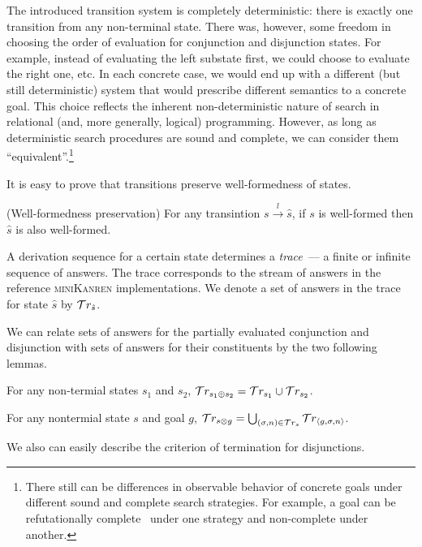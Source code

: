 The introduced transition system is completely deterministic: there is exactly one transition from any non-terminal state.
There was, however, some freedom in choosing the order of evaluation for conjunction and
disjunction states. For example, instead of evaluating the left substate first, we could choose to evaluate the right one, etc. In each concrete case, we would
end up with a different (but still deterministic) system that would prescribe different semantics to a concrete goal. This choice reflects the inherent
non-deterministic nature of search in relational (and, more generally, logical) programming. However, as long as deterministic search procedures
are sound and complete, we can consider them ``equivalent''.\footnote{There still can be differences in observable behavior of concrete goals under different
sound and complete search strategies. For example, a goal can be refutationally complete~\cite{WillThesis} under one strategy and non-complete under another.}

It is easy to prove that transitions preserve well-formedness of states.

\begin{lemma}{(Well-formedness preservation)}
\label{lem:well_formedness_preservation}
For any transintion $s \xrightarrow{l} \hat{s}$, if $s$ is well-formed then $\hat{s}$ is also well-formed.
\end{lemma}

A derivation sequence for a certain state determines a \emph{trace}~--- a finite or infinite sequence of answers. The trace corresponds to the stream of answers
in the reference \textsc{miniKanren} implementations. We denote a set of answers in the trace for state $\hat{s}$ by $\mathcal{T}r_{\hat{s}}$.

We can relate sets of answers for the partially evaluated conjunction and disjunction with sets of answers for their constituents by the two following lemmas.

\begin{lemma}
\label{lem:sum_answers}
For any non-termial states $s_1$ and $s_2$, $\mathcal{T}r_{s_1 \oplus s_2} = \mathcal{T}r_{s_1} \cup \mathcal{T}r_{s_2}$.
\end{lemma}

\begin{lemma}
\label{lem:prod_answers}
For any nontermial state $s$ and goal $g$,  \mbox{$\mathcal{T}r_{s \otimes g} = \bigcup_{(\sigma, n) \in \mathcal{T}r_{s}} \mathcal{T}r_{\left<{g, \sigma, n}\right>}$}.
\end{lemma}

We also can easily describe the criterion of termination for disjunctions.

